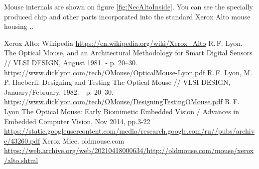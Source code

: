 \documentclass[11pt, a4paper]{article}
\begin{document}
Mouse internals are shown on figure \ref{fig:NecAltoInside}. You can see the specially produced chip \cite{vlsi82} and other parts incorporated into the standard Xerox Alto mouse housing \cite{vlsi82}..

\begin{thebibliography}{9}
 Xerox Alto: Wikipedia \url{https://en.wikipedia.org/wiki/Xerox_Alto}
 R.\,F. Lyon. The Optical Mouse, and an Architectural Methodology for
Smart Digital Sensors // VLSI DESIGN, August 1981. - p. 20--30. \url{https://www.dicklyon.com/tech/OMouse/OpticalMouse-Lyon.pdf}
 R.\,F. Lyon, M.\,P. Haeberli. Designing and Testing The Optical Mouse // VLSI DESIGN, January/February, 1982. - p. 20--30. \url{https://www.dicklyon.com/tech/OMouse/DesigningTestingOMouse.pdf}
 R.\,F. Lyon The Optical Mouse: Early Biomimetic Embedded Vision / Advances in Embedded Computer Vision, Nov 2014, pp.3-22 \url{https://static.googleusercontent.com/media/research.google.com/ru//pubs/archive/43260.pdf}
 Xerox Mice. oldmouse.com \url{https://web.archive.org/web/20210418000634/http://oldmouse.com/mouse/xerox/alto.shtml}
\end{thebibliography}
\end{document}
